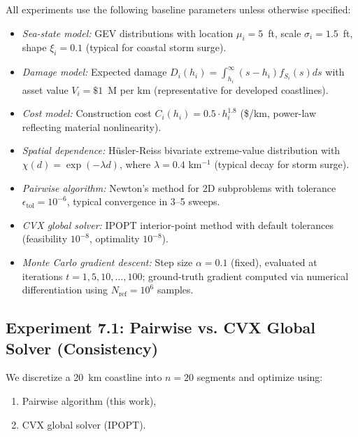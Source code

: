 \documentclass[12pt]{article}
\theoremstyle{definition}
\begin{document}
All experiments use the following baseline parameters unless otherwise specified:

\begin{itemize}
    \item \emph{Sea-state model:} GEV distributions with location $\mu_i = 5$~ft, scale $\sigma_i = 1.5$~ft, shape $\xi_i = 0.1$ (typical for coastal storm surge).

    \item \emph{Damage model:} Expected damage $D_i(h_i) = \int_{h_i}^\infty (s-h_i) f_{S_i}(s) ds$ with asset value $V_i = \$1$~M per km (representative for developed coastlines).

    \item \emph{Cost model:} Construction cost $C_i(h_i) = 0.5 \cdot h_i^{1.8}$ (\$/km, power-law reflecting material nonlinearity).

    \item \emph{Spatial dependence:} Hüsler-Reiss bivariate extreme-value distribution with $\chi(d) = \exp(-\lambda d)$, where $\lambda = 0.4$ km$^{-1}$ (typical decay for storm surge).

    \item \emph{Pairwise algorithm:} Newton's method for 2D subproblems with tolerance $\epsilon_{\text{tol}} = 10^{-6}$, typical convergence in 3--5 sweeps.

    \item \emph{CVX global solver:} IPOPT interior-point method with default tolerances (feasibility $10^{-8}$, optimality $10^{-8}$).

    \item \emph{Monte Carlo gradient descent:} Step size $\alpha = 0.1$ (fixed), evaluated at iterations $t = 1, 5, 10, \ldots, 100$; ground-truth gradient computed via numerical differentiation using $N_{\text{ref}} = 10^6$ samples.
\end{itemize}

\subsection{Experiment 7.1: Pairwise vs. CVX Global Solver (Consistency)}

We discretize a 20~km coastline into $n=20$ segments and optimize using:
\begin{enumerate}
    \item Pairwise algorithm (this work),
    \item CVX global solver (IPOPT).
\end{enumerate}
\end{document}
